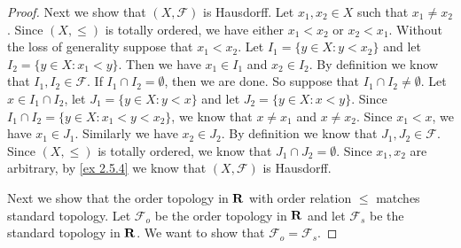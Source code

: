 \begin{proof}
  Next we show that \((X, \mathcal{F})\) is Hausdorff.
  Let \(x_1, x_2 \in X\) such that \(x_1 \neq x_2\).
  Since \((X, \leq)\) is totally ordered, we have either \(x_1 < x_2\) or \(x_2 < x_1\).
  Without the loss of generality suppose that \(x_1 < x_2\).
  Let \(I_1 = \{y \in X : y < x_2\}\) and let \(I_2 = \{y \in X : x_1 < y\}\).
  Then we have \(x_1 \in I_1\) and \(x_2 \in I_2\).
  By definition we know that \(I_1, I_2 \in \mathcal{F}\).
  If \(I_1 \cap I_2 = \emptyset\), then we are done.
  So suppose that \(I_1 \cap I_2 \neq \emptyset\).
  Let \(x \in I_1 \cap I_2\), let \(J_1 = \{y \in X : y < x\}\) and let \(J_2 = \{y \in X : x < y\}\).
  Since \(I_1 \cap I_2 = \{y \in X : x_1 < y < x_2\}\), we know that \(x \neq x_1\) and \(x \neq x_2\).
  Since \(x_1 < x\), we have \(x_1 \in J_1\).
  Similarly we have \(x_2 \in J_2\).
  By definition we know that \(J_1, J_2 \in \mathcal{F}\).
  Since \((X, \leq)\) is totally ordered, we know that \(J_1 \cap J_2 = \emptyset\).
  Since \(x_1, x_2\) are arbitrary, by \cref{ex 2.5.4} we know that \((X, \mathcal{F})\) is Hausdorff.

  Next we show that the order topology in \(\mathbf{R}\) with order relation \(\leq\) matches standard topology.
  Let \(\mathcal{F}_o\) be the order topology in \(\mathbf{R}\) and let \(\mathcal{F}_s\) be the standard topology in \(\mathbf{R}\).
  We want to show that \(\mathcal{F}_o = \mathcal{F}_s\).


\end{proof}
